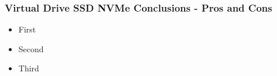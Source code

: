 \vspace*{-\baselineskip}
\subsubsection{Virtual Drive SSD NVMe Conclusions - Pros and Cons}
\begin{itemize}
  \item First
  \item Second
  \item Third
\end{itemize}